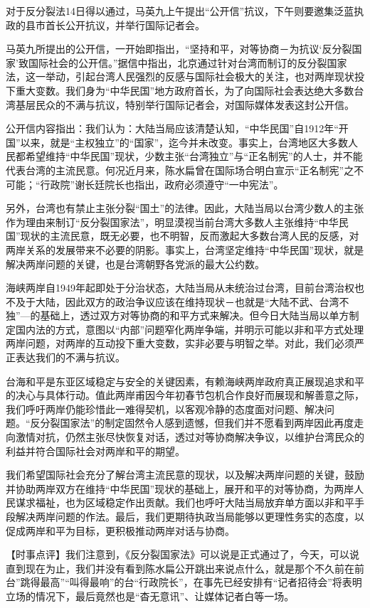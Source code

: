 \documentclass[a4paper,11pt]{article}
\begin{document}
\begin{itemize}
   对于反分裂法14日得以通过，马英九上午提出“公开信”抗议，下午则要邀集泛蓝执政的县市首长公开抗议，并举行国际记者会。

   马英九所提出的公开信，一开始即指出，“坚持和平，对等协商－为抗议‘反分裂国家’致国际社会的公开信。”据信中指出，北京通过针对台湾而制订的反分裂国家法，这一举动，引起台湾人民强烈的反感与国际社会极大的关注，也对两岸现状投下重大变数。我们身为“中华民国”地方政府首长，为了向国际社会表达绝大多数台湾基层民众的不满与抗议，特别举行国际记者会，对国际媒体发表这封公开信。

   公开信内容指出：我们认为：大陆当局应该清楚认知，“中华民国”自1912年“开国”以来，就是“主权独立”的“国家”，迄今并未改变。事实上，台湾地区大多数人民都希望维持“中华民国”现状，少数主张“台湾独立”与“正名制宪”的人士，并不能代表台湾的主流民意。何况近月来，陈水扁曾在国际场合明白宣示“正名制宪”之不可能；“行政院”谢长廷院长也指出，政府必须遵守“一中宪法”。

   另外，台湾也有禁止主张分裂“国土”的法律。因此，大陆当局以台湾少数人的主张作为理由来制订“反分裂国家法”，明显漠视当前台湾大多数人主张维持“中华民国”现状的主流民意，既无必要，也不明智，反而激起大多数台湾人民的反感，对两岸关系的发展带来不必要的阴影。事实上，台湾坚定维持“中华民国”现状，就是解决两岸问题的关键，也是台湾朝野各党派的最大公约数。

   海峡两岸自1949年起即处于分治状态，大陆当局从未统治过台湾，目前台湾治权也不及于大陆，因此双方的政治争议应该在维持现状－也就是“大陆不武、台湾不独”—的基础上，透过双方对等协商的和平方式来解决。但今日大陆当局以单方制定国内法的方式，意图以“内部”问题窄化两岸争端，并明示可能以非和平方式处理两岸问题，对两岸的互动投下重大变数，实非必要与明智之举。对此，我们必须严正表达我们的不满与抗议。

   台海和平是东亚区域稳定与安全的关键因素，有赖海峡两岸政府真正展现追求和平的决心与具体行动。值此两岸甫因今年初春节包机合作良好而展现和解善意之际，我们呼吁两岸仍能珍惜此一难得契机，以客观冷静的态度面对问题、解决问题。“反分裂国家法”的制定固然令人感到遗憾，但我们并不愿看到两岸因此再度走向激情对抗，仍然主张尽快恢复对话，透过对等协商解决争议，以维护台湾民众的利益并符合国际社会对两岸和平的期望。

   我们希望国际社会充分了解台湾主流民意的现状，以及解决两岸问题的关键，鼓励并协助两岸双方在维持“中华民国”现状的基础上，展开和平的对等协商，为两岸人民谋求福祉，也为区域稳定作出贡献。我们也呼吁大陆当局放弃单方面以非和平手段解决两岸问题的作法。最后，我们更期待执政当局能够以更理性务实的态度，以促成两岸和平为目标，更积极推动两岸对话与协商。

   【时事点评】我们注意到，《反分裂国家法》可以说是正式通过了，今天，可以说直到现在为止，我们并没有看到陈水扁公开跳出来说点什么，就是那个不久前在前台”跳得最高”“叫得最响”的台“行政院长”，在事先已经安排有“记者招待会”将表明立场的情况下，最后竟然也是“杳无意讯”、让媒体记者白等一场。
 

\end{itemize}
\end{document}
